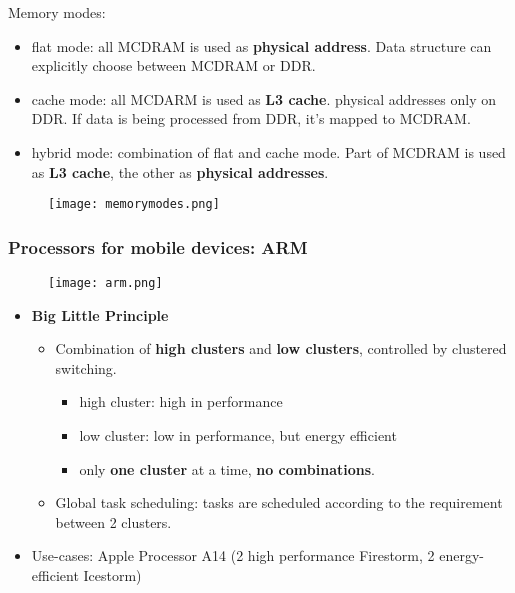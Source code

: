\begin{itemize}
\begin{itemize}
		Memory modes:
		\begin{itemize}
			\item flat mode: all MCDRAM is used as \textbf{physical address}. Data structure can explicitly choose between MCDRAM or DDR. 
			\item cache mode: all MCDARM is used as \textbf{L3 cache}. physical addresses only on DDR. If data is being processed from DDR, it's mapped to MCDRAM.
			\item hybrid mode: combination of flat and cache mode. Part of MCDRAM is used as \textbf{L3 cache}, the other as \textbf{physical addresses}.
		\end{itemize}
		\begin{figure}[H]
			\centering
			\texttt{[image: memorymodes.png]}
		\end{figure}
	\end{itemize}	
\end{itemize}

\subsubsection{Processors for mobile devices: ARM}
\begin{figure}[H]
	\centering
	\texttt{[image: arm.png]}
\end{figure}
\begin{itemize}
	\item \textbf{Big Little Principle}
	\begin{itemize}
		\item Combination of \textbf{high clusters} and \textbf{low clusters}, controlled by clustered switching. 
		\begin{itemize}
			\item high cluster: high in performance
			\item low cluster: low in performance, but energy efficient
			\item only \textbf{one cluster} at a time, \textbf{no combinations}.
		\end{itemize}
		\item Global task scheduling: tasks are scheduled according to the requirement between 2 clusters.
	\end{itemize}
	\item Use-cases: Apple Processor A14 (2 high performance Firestorm, 2 energy-efficient Icestorm)
\end{itemize}


